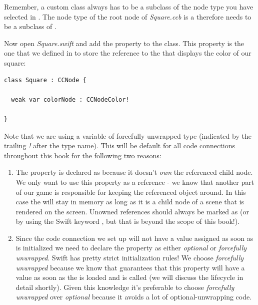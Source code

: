 Remember, a custom class always has to be a subclass of the node type
you have selected in \SB{}. The node type of the root node of
\textit{Square.ccb} is a \ccnode{} therefore  needs to be a subclass of \ccnode{}.

\begin{leftbar}
Now open \textit{Square.swift} and add the property
 to the  class. This property is the
one that we defined in \SB{} to store the reference to the
 that displays the color of our square:
\begin{lstlisting}
class Square : CCNode {
  
  weak var colorNode : CCNodeColor!
  
}
\end{lstlisting}
\end{leftbar}

Note that we are using a  variable of forcefully
unwrapped type (indicated by the trailing \textit{!} after the type name). This
will be default for all code connections throughout this book for the following
two reasons:

\begin{enumerate}
 
\item The property is declared as  because it doesn't \textit{own}
the referenced child node. We only want to use this property as a reference - we
know that another part of our game is responsible for keeping the referenced
object around. In this case the  will stay in memory as
long as it is a child node of a scene that is rendered on the screen. Unowned
references should always be marked as  (or by using the Swift
keyword , but that is beyond the scope of this book!).

\item Since the code connection we set up will not have a value assigned as soon as
 is initialized we need to declare the property as either
\textit{optional} or \textit{forcefully unwrapped}. Swift has pretty strict
initialization rules! We choose \textit{forcefully unwrapped} because we know that
\cocos{} guarantees that this property will have a value as soon as the
\ccbfile{} is loaded and  is called (we will discuss
the \cocos{} lifecycle in detail shortly).
Given this knowledge it's preferable to choose \textit{forcefully unwrapped} over
\textit{optional} because it avoids a lot of optional-unwrapping code.

\end{enumerate}

